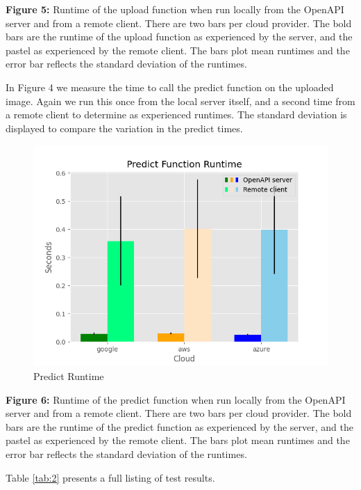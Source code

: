 \textbf{Figure 5:} Runtime of the upload function when run locally from
the OpenAPI server and from a remote client. There are two bars per
cloud provider. The bold bars are the runtime of the upload function as
experienced by the server, and the pastel as experienced by the remote
client. The bars plot mean runtimes and the error bar reflects the
standard deviation of the runtimes.

In Figure 4 we measure the time to call the predict function on the
uploaded image. Again we run this once from the local server itself, and
a second time from a remote client to determine as experienced runtimes.
The standard deviation is displayed to compare the variation in the
predict times.

\begin{figure}
\centering
\includegraphics[width=\columnwidth]{../images/sample_graph_4.png}
\caption{Predict Runtime}
\end{figure}

\textbf{Figure 6:} Runtime of the predict function when run locally from
the OpenAPI server and from a remote client. There are two bars per
cloud provider. The bold bars are the runtime of the predict function as
experienced by the server, and the pastel as experienced by the remote
client. The bars plot mean runtimes and the error bar reflects the
standard deviation of the runtimes.

Table \ref{tab:2} presents a full listing of test results.

